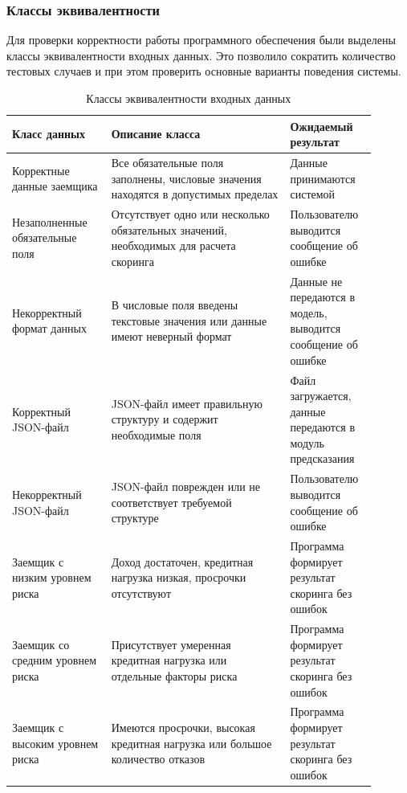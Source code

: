 \subsubsection{Классы эквивалентности}

Для проверки корректности работы программного обеспечения были выделены классы эквивалентности входных данных. Это позволило сократить количество тестовых случаев и при этом проверить основные варианты поведения системы.

\begin{table}[ht!]
  \centering
  \caption{Классы эквивалентности входных данных}
  \label{tab:equivalence_classes}
  \begin{tabular}{|p{0.25\linewidth}|p{0.45\linewidth}|p{0.2\linewidth}|}
    \hline
    Класс данных                     & Описание класса                                                                        & Ожидаемый результат                                          \\
    \hline
    Корректные данные заемщика       & Все обязательные поля заполнены, числовые значения находятся в допустимых пределах     & Данные принимаются системой                                  \\
    \hline
    Незаполненные обязательные поля  & Отсутствует одно или несколько обязательных значений, необходимых для расчета скоринга & Пользователю выводится сообщение об ошибке                   \\
    \hline
    Некорректный формат данных       & В числовые поля введены текстовые значения или данные имеют неверный формат            & Данные не передаются в модель, выводится сообщение об ошибке \\
    \hline
    Корректный JSON-файл             & JSON-файл имеет правильную структуру и содержит необходимые поля                       & Файл загружается, данные передаются в модуль предсказания    \\
    \hline
    Некорректный JSON-файл           & JSON-файл поврежден или не соответствует требуемой структуре                           & Пользователю выводится сообщение об ошибке                   \\
    \hline
    Заемщик с низким уровнем риска   & Доход достаточен, кредитная нагрузка низкая, просрочки отсутствуют                     & Программа формирует результат скоринга без ошибок            \\
    \hline
    Заемщик со средним уровнем риска & Присутствует умеренная кредитная нагрузка или отдельные факторы риска                  & Программа формирует результат скоринга без ошибок            \\
    \hline
    Заемщик с высоким уровнем риска  & Имеются просрочки, высокая кредитная нагрузка или большое количество отказов           & Программа формирует результат скоринга без ошибок            \\
    \hline
  \end{tabular}
\end{table}


